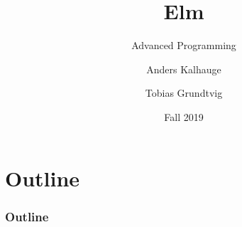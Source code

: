 \makeatletter
{}
\makeatother
\graphicspath{{../setup/}{.}}
\usepackage{arydshln}


\title{Elm}
\subtitle{Advanced Programming}
\date{Fall 2019}
\author{Anders Kalhauge \and Tobias Grundtvig}


\begin{CJK}{UTF8}{gbsn}

\begin{frame}
\titlepage
\end{frame}

\section*{Outline}

\begin{frame}[t]
\frametitle{Outline}
\tableofcontents
\end{frame}










\end{CJK}

